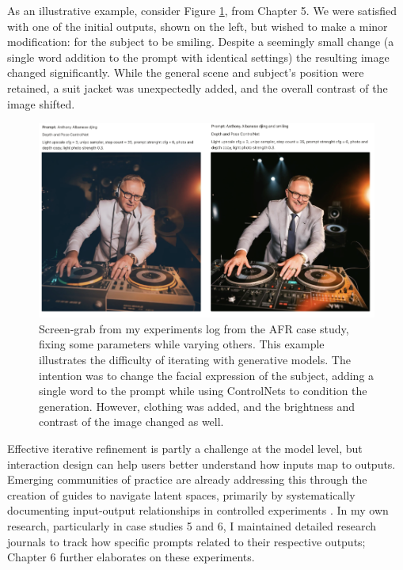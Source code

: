 As an illustrative example, consider Figure \ref{fig:albo_series}, from Chapter 5. We were satisfied with one of the initial outputs, shown on the left, but wished to make a minor modification: for the subject to be smiling. Despite a seemingly small change (a single word addition to the prompt with identical settings) the resulting image changed significantly. While the general scene and subject's position were retained, a suit jacket was unexpectedly added, and the overall contrast of the image shifted. 

\begin{figure}[H]
    \centering
    \includegraphics[width=1\linewidth]{alboexperiments.png}
    \caption{Screen-grab from my experiments log from the AFR case study, fixing some parameters while varying others. This example illustrates the difficulty of iterating with generative models. The intention was to change the facial expression of the subject, adding a single word to the prompt while using ControlNets to condition the generation. However, clothing was added, and the brightness and contrast of the image changed as well.}
    \label{fig:albo_series}
\end{figure}


Effective iterative refinement is partly a challenge at the model level, but interaction design can help users better understand how inputs map to outputs. Emerging communities of practice are already addressing this through the creation of guides to navigate latent spaces, primarily by systematically documenting input-output relationships in controlled experiments \cite{Smith2022-dm}. In my own research, particularly in case studies 5 and 6, I maintained detailed research journals to track how specific prompts related to their respective outputs; Chapter 6 further elaborates on these experiments.

